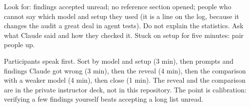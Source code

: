 Look for: findings accepted unread; no reference section opened; people who cannot say which model and setup they used (it is a line on the log, because it changes the audit a great deal in agent tests). Do not explain the statistics. Ask what Claude said and how they checked it. Stuck on setup for five minutes: pair people up.

Participants speak first. Sort by model and setup (3 min), then prompts and findings Claude got wrong (3 min), then the reveal (4 min), then the comparison with a weaker model (4 min), then close (1 min). The reveal and the comparison are in the private instructor deck, not in this repository. The point is calibration: verifying a few findings yourself beats accepting a long list unread.

